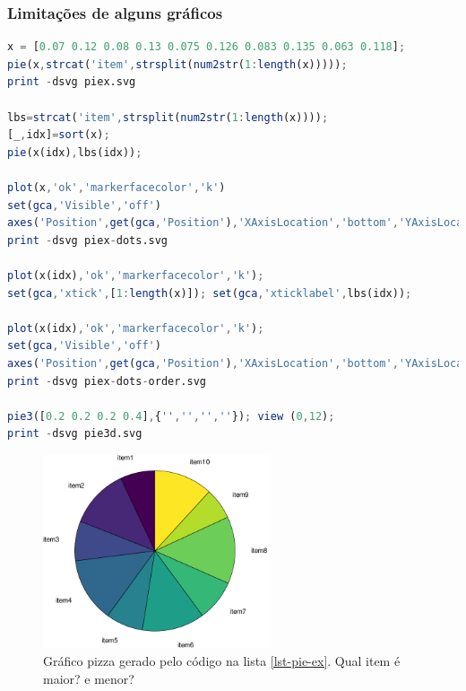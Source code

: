 \begin{frame}
\frametitle{Limitações de alguns gráficos}

\begin{lstlisting}[language=Octave, label=lst-pie-ex, caption={Exemplo de limitações do gráficos.}, postbreak=\mbox{$\hookrightarrow$\space}, basicstyle=\fontsize{8}{10}\selectfont\ttfamily]
x = [0.07 0.12 0.08 0.13 0.075 0.126 0.083 0.135 0.063 0.118]; 
pie(x,strcat('item',strsplit(num2str(1:length(x)))));
print -dsvg piex.svg

lbs=strcat('item',strsplit(num2str(1:length(x))));
[_,idx]=sort(x);
pie(x(idx),lbs(idx)); 

plot(x,'ok','markerfacecolor','k')
set(gca,'Visible','off')
axes('Position',get(gca,'Position'),'XAxisLocation','bottom','YAxisLocation','left', 'Color','none','XTickLabel',get(gca,'XTickLabel'),'YTickLabel',get(gca,'YTickLabel'),'XColor','k','YColor','k','LineWidth',1,'TickDir','out');
print -dsvg piex-dots.svg

plot(x(idx),'ok','markerfacecolor','k');
set(gca,'xtick',[1:length(x)]); set(gca,'xticklabel',lbs(idx));

plot(x(idx),'ok','markerfacecolor','k');
set(gca,'Visible','off')
axes('Position',get(gca,'Position'),'XAxisLocation','bottom','YAxisLocation','left', 'Color','none','XTick',linspace(1/(length(x)),1,length(x)),'XTickLabel',lbs(idx),'YTickLabel',get(gca,'YTickLabel'),'XColor','k','YColor','k','LineWidth',1,'TickDir','out');
print -dsvg piex-dots-order.svg

pie3([0.2 0.2 0.2 0.4],{'','','',''}); view (0,12);
print -dsvg pie3d.svg
\end{lstlisting}

\begin{figure}[h]
 \centering
  \includegraphics[width=0.6\textwidth,height=0.6\textheight,keepaspectratio]{figures/piex.pdf}
 \caption{Gráfico pizza gerado pelo código na lista \ref{lst-pie-ex}. Qual item é maior? e menor?}
 \label{fig-piex}
\end{figure}



\end{frame}
